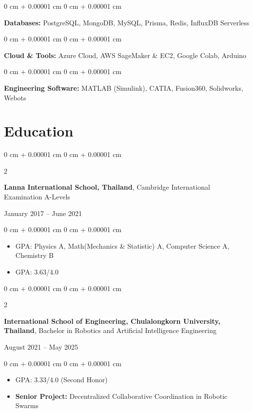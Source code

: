 \documentclass[10pt, letterpaper]{article}
\newenvironment{highlights}{
    \begin{itemize}[
        topsep=0.0 cm,
        parsep=0.0 cm,
        partopsep=0pt,
        itemsep=0pt,
        leftmargin=0 cm + 10pt
    ]
}{
    \end{itemize}
} %
\newenvironment{onecolentry}{
    \begin{adjustwidth}{
        0 cm + 0.00001 cm
    }{
        0 cm + 0.00001 cm
    }
}{
    \end{adjustwidth}
} %
\newenvironment{twocolentry}[2][]{
    \onecolentry
    \def\secondColumn{#2}
    \setcolumnwidth{\fill, 4.5 cm}
    \begin{paracol}{2}
}{
    \switchcolumn \raggedleft \secondColumn
    \end{paracol}
    \endonecolentry
} %
\begin{document}
        \vspace{0.1 cm}
        \begin{onecolentry}
            \textbf{Databases:} PostgreSQL, MongoDB, MySQL, Prisma, Redis, InfluxDB Serverless
        \end{onecolentry}
        
        \vspace{0.1 cm}
        \begin{onecolentry}
            \textbf{Cloud \& Tools:} Azure Cloud, AWS SageMaker \& EC2, Google Colab, Arduino
        \end{onecolentry}
        
        \vspace{0.1 cm}
        \begin{onecolentry}
            \textbf{Engineering Software:} MATLAB (Simulink), CATIA, Fusion360, Solidworks, Webots
        \end{onecolentry}

    \section{Education}
        \begin{twocolentry}{
        January 2017 – June 2021
        }
        \textbf{Lanna International School, Thailand}, Cambridge International Examination A-Levels 
        \end{twocolentry}
        \begin{onecolentry}
            \begin{highlights}
                \item GPA: Physics A, Math(Mechanics \& Statistic) A, Computer Science A, Chemistry B 
                \item GPA: 3.63/4.0 %
                
            \end{highlights}
        \end{onecolentry}
        \vspace{0.10 cm}
        
        \begin{twocolentry}{
            August 2021 – May 2025
            }
            \textbf{International School of Engineering, Chulalongkorn University, Thailand}, Bachelor in Robotics and Artificial Intelligence Engineering 
        \end{twocolentry}
        \begin{onecolentry}
            \begin{highlights}
                \item GPA: 3.33/4.0 (Second Honor)%
                \item \textbf{Senior Project:} Decentralized Collaborative Coordination in Robotic Swarms
            \end{highlights}
        \end{onecolentry}
        \vspace{0.10 cm}
\end{document}
